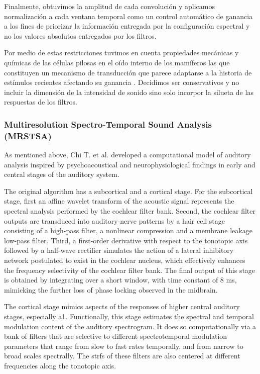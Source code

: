 {Finalmente, obtuvimos la amplitud de cada convolución y aplicamos normalización a cada ventana temporal
como un control automático de ganancia a los fines de priorizar la información entregada por la
configuración espectral y no los valores absolutos entregados por los filtros.

Por medio de estas restricciones tuvimos en cuenta propiedades mecánicas y químicas de las células pilosas en el oído interno de los mamíferos
las que constituyen un mecanismo de transducción que parece adaptarse a la historia de estímulos recientes afectando su ganancia
\cite{eatock_2000,holt_2000,le_goff_2005}. 
Decidimos ser conservativos y no incluir la dimensión de la intensidad de sonido sino solo incorpor la silueta de las respuestas de los filtros.
}{
\subsubsection{Multiresolution Spectro-Temporal Sound Analysis (MRSTSA)}

As mentioned above, Chi T. et al. \cite{chi_2005} developed a computational model of auditory analysis inspired by psychoacoustical and
neurophysiological findings in early and central stages of the auditory system.

The original algorithm has a subcortical and a cortical stage.
For the subcortical stage, first an affine wavelet transform of the acoustic signal
represents the spectral analysis performed by the cochlear filter bank.
Second, the cochlear filter outputs are transduced into auditory-nerve
patterns by a hair cell stage consisting of a high-pass filter,
a nonlinear compression and a membrane leakage low-pass filter.
Third, a first-order derivative with respect to the tonotopic axis
followed by a half-wave rectifier
simulates the action of a lateral inhibitory
network postulated to exist in the cochlear nucleus,
which effectively enhances the frequency
selectivity of the cochlear filter bank.
The final output of this stage is obtained by integrating
over a short window, with time constant of 8 ms, mimicking
the further loss of phase locking observed
in the midbrain.

The cortical stage mimics aspects of the responses of higher
central auditory stages, especially \gls{a1}.
Functionally, this stage estimates the
spectral and temporal modulation content of the auditory
spectrogram. It does so computationally via a bank of filters
that are selective to different spectrotemporal modulation parameters
that range from slow to fast rates temporally, and
from narrow to broad scales spectrally. The \glspl{strf}
of these filters are also centered at
different frequencies along the tonotopic axis.

}
